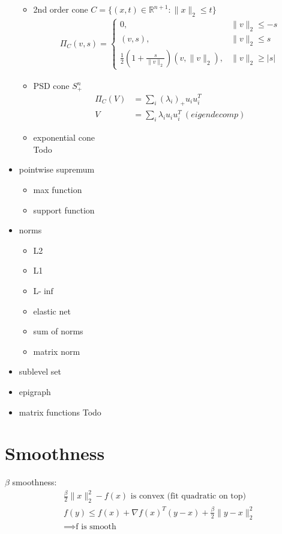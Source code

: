 \documentclass[8pt,letter]{article}
\newcommand{\R}{\mathbb{R}}
\begin{document}
\begin{multicols*}{2}
\begin{itemize}
\begin{itemize}
    \item 2nd order cone $C=\{(x,t)\in \R^{n+1}: \|x\|_2 \leq t\}$
      \begin{align*}
        \Pi_C(v,s) = \begin{cases}
          0,& \|v\|_2 \leq -s\\
          (v,s),& \|v\|_2 \leq s\\
          \frac{1}{2}(1+\frac{s}{\|v\|_2})(v,\|v\|_2),& \|v\|_2 \geq |s|
        \end{cases}
      \end{align*}
    \item PSD cone $S_+^n$
      \begin{align*}
        \Pi_C(V)&=\sum_i (\lambda_i)_+ u_i u_i^T\\
        V&=\sum_i \lambda_i u_i u_i^T\ (eigendecomp)
      \end{align*}
    \item exponential cone\\
      Todo
    \end{itemize}
  \item pointwise supremum
    \begin{itemize}
    \item max function
    \item support function
    \end{itemize}
  \item norms
    \begin{itemize}
    \item L2
    \item L1
    \item L-$\inf$
    \item elastic net
    \item sum of norms
    \item matrix norm
    \end{itemize}
  \item sublevel set
  \item epigraph
  \item matrix functions
    Todo
  \end{itemize}

  \vfill\null
  \pagebreak
    
  \section{Smoothness}
  $\beta$ smoothness:
  \begin{align*}
    & \frac{\beta}{2} \|x\|_2^2 - f(x) \text{ is convex (fit quadratic on top)}\\
    & f(y) \leq f(x) + \nabla f(x)^T (y-x) + \frac{\beta}{2} \|y-x\|_2^2\\
    & \implies \text{f is smooth}
  \end{align*}


\end{multicols*}
\end{document}
